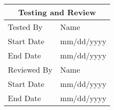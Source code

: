 \begin{tabular}{p{7.5cm}p{7.5cm}}
\toprule
\multicolumn{2}{c}{\textbf{Testing and Review}} \\
\midrule
Tested By & Name\\
Start Date & mm/dd/yyyy \\
End Date & mm/dd/yyyy \\
\midrule
Reviewed By & Name \\
Start Date & mm/dd/yyyy \\
End Date & mm/dd/yyyy \\
\bottomrule\end{tabular}

